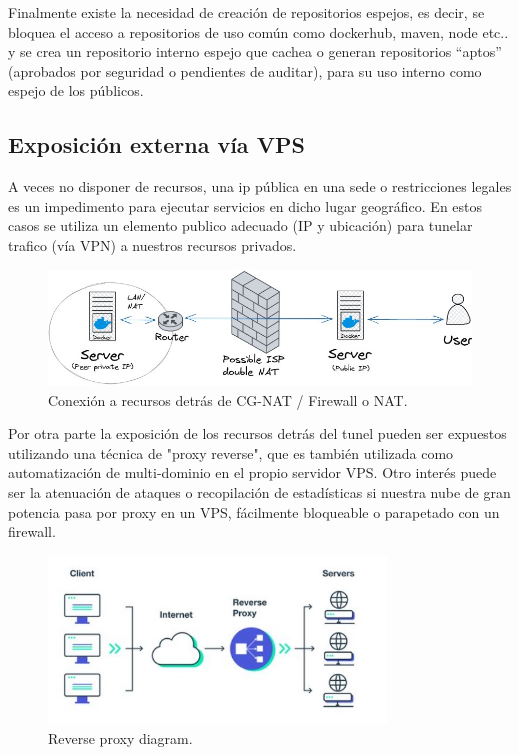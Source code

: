Finalmente existe la necesidad de creación de repositorios espejos, es decir, se bloquea el acceso a repositorios de uso común como dockerhub, maven, node etc.. y se crea un repositorio interno espejo que cachea o generan repositorios “aptos” (aprobados por seguridad o pendientes de auditar), para su uso interno como espejo de los públicos.

\subsection{Exposición externa vía VPS}
A veces no disponer de recursos, una ip pública en una sede o restricciones legales es un impedimento para ejecutar servicios en dicho lugar geográfico.
En estos casos se utiliza un elemento publico adecuado (IP y ubicación) para tunelar trafico (vía VPN) a nuestros recursos privados.
\begin{figure}[!htb]
\begin{center}
\includegraphics[width=1\textwidth]{./figuras/tunnel_resources.jpg}
\caption{Conexión a recursos detrás de CG-NAT / Firewall o NAT.}
\label{F:tunnel_resources}
\end{center}
\end{figure}

Por otra parte la exposición de los recursos detrás del tunel pueden ser expuestos utilizando una técnica de "proxy reverse", que es también utilizada como automatización de multi-dominio en el propio servidor VPS. Otro interés puede ser la atenuación de ataques o recopilación de estadísticas si nuestra nube de gran potencia pasa por proxy en un VPS, fácilmente bloqueable o parapetado con un firewall.

\begin{figure}[!htb]
\begin{center}
\includegraphics[width=0.8\textwidth]{./figuras/reverse_proxy.jpg}
\caption{Reverse proxy diagram.}
\label{F:reverse_proxy}
\end{center}
\end{figure}

